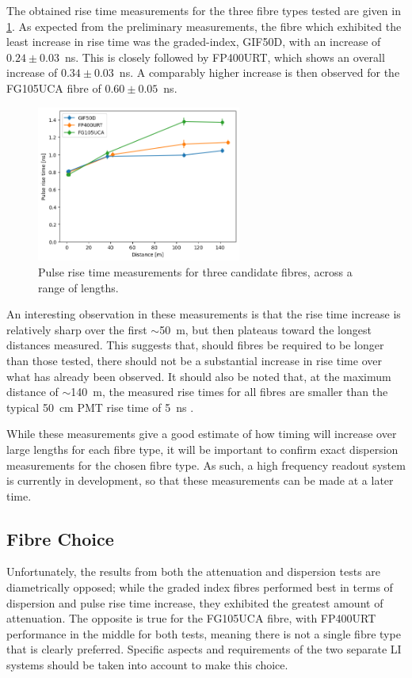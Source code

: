 \documentclass[a4paper,11pt]{article}
\let\oldsim\sim
\renewcommand{\sim}{{\oldsim}}
\begin{document}
The obtained rise time measurements for the three fibre types tested are given in \cref{fig:disprise}. As expected from the preliminary measurements, the fibre which exhibited the least increase in rise time was the graded-index, GIF50D, with an increase of $0.24\pm0.03$~ns. This is closely followed by FP400URT, which shows an overall increase of $0.34\pm0.03$~ns. A comparably higher increase is then observed for the FG105UCA fibre of $0.60\pm0.05$~ns.
\begin{figure}[h]
\centering
\includegraphics[width=0.6\textwidth]{RiseTimeOct24_zero.png}
\caption{Pulse rise time measurements for three candidate fibres, across a range of lengths.}\label{fig:disprise}
\end{figure}
An interesting observation in these measurements is that the rise time increase is relatively sharp over the first $\sim$50~m, but then plateaus toward the longest distances measured. This suggests that, should fibres be required to be longer than those tested, there should not be a substantial increase in rise time over what has already been observed. It should also be noted that, at the maximum distance of $\sim$140~m, the measured rise times for all fibres are smaller than the typical 50~cm PMT rise time of 5~ns \cite{bib:hkpmt}.

While these measurements give a good estimate of how timing will increase over large lengths for each fibre type, it will be important to confirm exact dispersion measurements for the chosen fibre type. As such, a high frequency readout system is currently in development, so that these measurements can be made at a later time.

\subsection{Fibre Choice}\label{sec:fibre:sub:choice}

Unfortunately, the results from both the attenuation and dispersion tests are diametrically opposed; while the graded index fibres performed best in terms of dispersion and pulse rise time increase, they exhibited the greatest amount of attenuation. The opposite is true for the FG105UCA fibre, with FP400URT performance in the middle for both tests, meaning there is not a single fibre type that is clearly preferred. Specific aspects and requirements of the two separate LI systems should be taken into account to make this choice.
\end{document}
